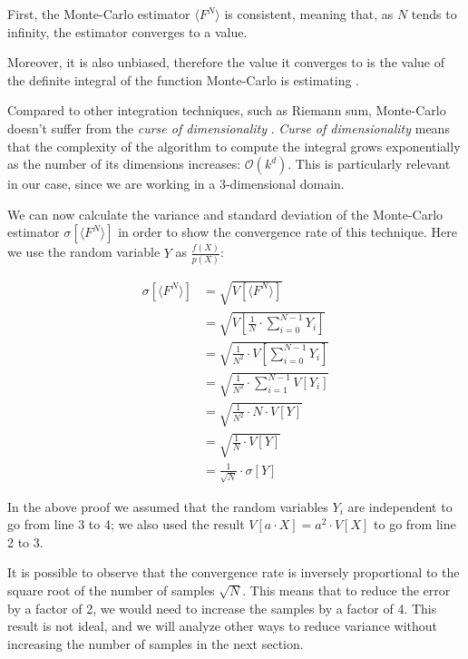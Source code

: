 \documentclass{PoliMi_MasterThesis}
\begin{document}
First, the Monte-Carlo estimator $\langle F^N \rangle$ is consistent, meaning that, as $N$ tends to infinity, the estimator converges to a value.

Moreover, it is also unbiased, therefore the value it converges to is the value of the definite integral of the function Monte-Carlo is estimating \cite{monte_carlo_properties}. 

Compared to other integration techniques, such as Riemann sum, Monte-Carlo doesn't suffer from the \textit{curse of dimensionality} \cite{curse_of_dimensionality}. \textit{Curse of dimensionality} means that the complexity of the algorithm to compute the integral grows exponentially as the number of its dimensions increases: $\mathcal{O}(k^d)$. This is particularly relevant in our case, since we are working in a 3-dimensional domain.

We can now calculate the variance and standard deviation of the Monte-Carlo estimator $\sigma[\langle F^N \rangle]$ in order to show the convergence rate of this technique. Here we use the random variable $Y$ as  $\frac{\textit{f}(X)}{p(X)}$:

\begin{subequations}
	\begin{align*}
		\sigma[\langle F^N \rangle] &= \sqrt{V[\langle F^N \rangle]} \\
		&= \sqrt{V[\frac{1}{N}\cdot \sum_{i=0}^{N-1}Y_i]} \\
		&= \sqrt{\frac{1}{N^2}\cdot V[\sum_{i=0}^{N-1}Y_i]} \\
		&= \sqrt{\frac{1}{N^2}\cdot \sum_{i=1}^{N-1}V[Y_i]} \\
		&= \sqrt{\frac{1}{N^2} \cdot N \cdot V[Y]} \\
		&= \sqrt{\frac{1}{N} \cdot V[Y]} \\
		&= \frac{1}{\sqrt{N}} \cdot \sigma[Y]
	\end{align*}
\end{subequations}

In the above proof \cite{monte_carlo_convergence} we assumed that the random variables $Y_i$ are independent to go from line 3 to 4; we also used the result $V[a\cdot X] = a^2 \cdot V[X]$ to go from line 2 to 3.

It is possible to observe that the convergence rate is inversely proportional to the square root of the number of samples $\sqrt{N}$. This means that to reduce the error by a factor of 2, we would need to increase the samples by a factor of 4. This result is not ideal, and we will analyze other ways to reduce variance without increasing the number of samples in the next section.
\end{document}
